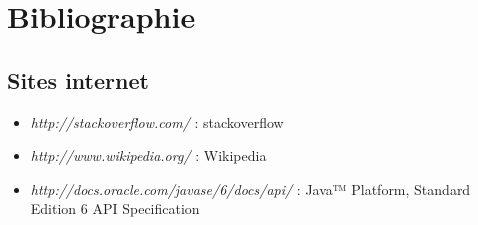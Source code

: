\section*{Bibliographie} %
{}

\subsection*{Sites internet}

\begin{itemize}
    \item \emph{http://stackoverflow.com/} : stackoverflow
    \item \emph{http://www.wikipedia.org/} : Wikipedia
    \item \emph{http://docs.oracle.com/javase/6/docs/api/} : 
        Java™ Platform, Standard Edition 6
        API Specification
\end{itemize}
